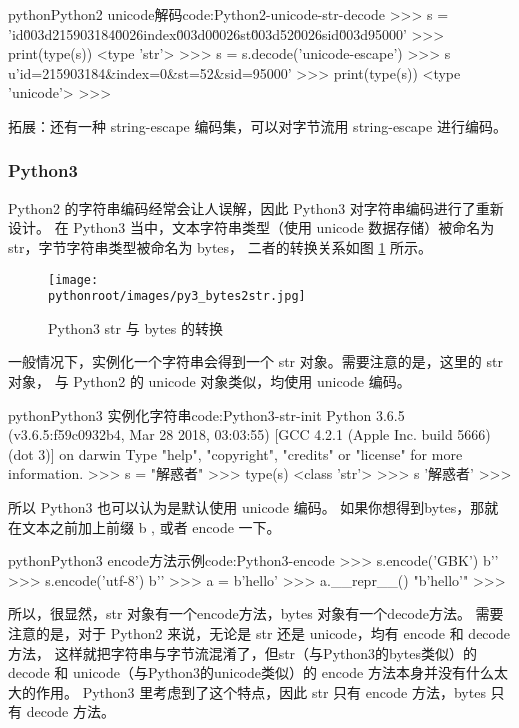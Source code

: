 \begin{jcode}{python}{Python2 unicode解码}{code:Python2-unicode-str-decode}
>>> s = 'id\u003d215903184\u0026index\u003d0\u0026st\u003d52\u0026sid\u003d95000'
>>> print(type(s))
<type 'str'>
>>> s = s.decode('unicode-escape')
>>> s
u'id=215903184&index=0&st=52&sid=95000'
>>> print(type(s))
<type 'unicode'>
>>>
\end{jcode}

拓展：还有一种 string-escape 编码集，可以对字节流用 string-escape 进行编码。

\subsubsection{Python3}
Python2 的字符串编码经常会让人误解，因此 Python3 对字符串编码进行了重新设计。
在 Python3 当中，文本字符串类型（使用 unicode 数据存储）被命名为 str，字节字符串类型被命名为 bytes，
二者的转换关系如图 \ref{fig:Python3-str-2-bytes} 所示。

\begin{figure}[ht]
  \centering
  \texttt{[image: \\pythonroot/images/py3\_bytes2str.jpg]}
  \caption{Python3 str 与 bytes 的转换}
  \label{fig:Python3-str-2-bytes}
\end{figure}

一般情况下，实例化一个字符串会得到一个 str 对象。需要注意的是，这里的 str 对象，
与 Python2 的 unicode 对象类似，均使用 unicode 编码。

\begin{jcode}{python}{Python3 实例化字符串}{code:Python3-str-init}
Python 3.6.5 (v3.6.5:f59c0932b4, Mar 28 2018, 03:03:55)
[GCC 4.2.1 (Apple Inc. build 5666) (dot 3)] on darwin
Type "help", "copyright", "credits" or "license" for more information.
>>> s = "解惑者"
>>> type(s)
<class 'str'>
>>> s
'解惑者'
>>>
\end{jcode}

所以 Python3 也可以认为是默认使用 unicode 编码。
如果你想得到bytes，那就在文本之前加上前缀 b , 或者 encode 一下。

\begin{jcode}{python}{Python3 encode方法示例}{code:Python3-encode}
>>> s.encode('GBK')
b'\xbd{}\xbb{}\xdf'
>>> s.encode('utf-8')
b''
>>> a = b'hello'
>>> a.__repr__()
"b'hello'"
>>>
\end{jcode}

所以，很显然，str 对象有一个encode方法，bytes 对象有一个decode方法。
需要注意的是，对于 Python2 来说，无论是 str 还是 unicode，均有 encode 和 decode 方法，
这样就把字符串与字节流混淆了，但str（与Python3的bytes类似）的decode 和
unicode（与Python3的unicode类似）的 encode 方法本身并没有什么太大的作用。
Python3 里考虑到了这个特点，因此 str 只有 encode 方法，bytes 只有 decode 方法。

